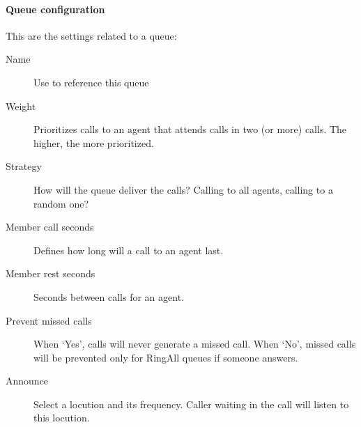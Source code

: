 \documentclass[letterpaper,10pt,spanish]{sphinxmanual}
\begin{document}
\paragraph{Queue configuration}
\label{administration_portal/client/vpbx/routing_endpoints/queues:queue-configuration}
This are the settings related to a queue:
\begin{description}
\item[{Name}] \leavevmode{}\label{administration_portal/client/vpbx/routing_endpoints/queues:term-name}
Use to reference this queue

\item[{Weight}] \leavevmode{}\label{administration_portal/client/vpbx/routing_endpoints/queues:term-weight}
Prioritizes calls to an agent that attends calls in two (or more) calls. The
higher, the more prioritized.

\item[{Strategy}] \leavevmode{}\label{administration_portal/client/vpbx/routing_endpoints/queues:term-strategy}
How will the queue deliver the calls? Calling to all agents, calling to a
random one?

\item[{Member call seconds}] \leavevmode{}\label{administration_portal/client/vpbx/routing_endpoints/queues:term-member-call-seconds}
Defines how long will a call to an agent last.

\item[{Member rest seconds}] \leavevmode{}\label{administration_portal/client/vpbx/routing_endpoints/queues:term-member-rest-seconds}
Seconds between calls for an agent.

\item[{Prevent missed calls}] \leavevmode{}\label{administration_portal/client/vpbx/routing_endpoints/queues:term-prevent-missed-calls}
When `Yes', calls will never generate a missed call. When `No', missed calls will be prevented only for RingAll
queues if someone answers.

\item[{Announce}] \leavevmode{}\label{administration_portal/client/vpbx/routing_endpoints/queues:term-announce}
Select a locution and its frequency. Caller waiting in the call will listen
to this locution.


\end{description}
\end{document}
